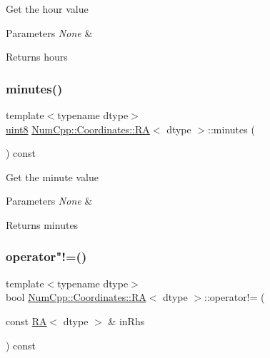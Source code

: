 Get the hour value


\begin{DoxyParams}{Parameters}
{\em None} & \\
\hline
\end{DoxyParams}
\begin{DoxyReturn}{Returns}
hours 
\end{DoxyReturn}
\mbox{\label{class_num_cpp_1_1_coordinates_1_1_r_a_af601755307ce7d786cf9acdab95abd45}} 
\subsubsection{\texorpdfstring{minutes()}{minutes()}}
{\footnotesize\ttfamily template$<$typename dtype$>$ \\
\mbox{\hyperlink{namespace_num_cpp_aee396d0469d6031cd18118c0a45bcdda}{uint8}} \mbox{\hyperlink{class_num_cpp_1_1_coordinates_1_1_r_a}{Num\+Cpp\+::\+Coordinates\+::\+RA}}$<$ dtype $>$\+::minutes (\begin{DoxyParamCaption}{ }\end{DoxyParamCaption}) const\hspace{0.3cm}{\ttfamily [inline]}}

Get the minute value


\begin{DoxyParams}{Parameters}
{\em None} & ~\newline
 \\
\hline
\end{DoxyParams}
\begin{DoxyReturn}{Returns}
minutes 
\end{DoxyReturn}
\mbox{\label{class_num_cpp_1_1_coordinates_1_1_r_a_aa6c272c2e34488048595dbd9ff850fc3}} 
\subsubsection{\texorpdfstring{operator"!=()}{operator!=()}}
{\footnotesize\ttfamily template$<$typename dtype$>$ \\
bool \mbox{\hyperlink{class_num_cpp_1_1_coordinates_1_1_r_a}{Num\+Cpp\+::\+Coordinates\+::\+RA}}$<$ dtype $>$\+::operator!= (\begin{DoxyParamCaption}\item[{const \mbox{\hyperlink{class_num_cpp_1_1_coordinates_1_1_r_a}{RA}}$<$ dtype $>$ \&}]{in\+Rhs }\end{DoxyParamCaption}) const\hspace{0.3cm}{\ttfamily [inline]}}

